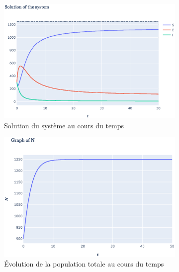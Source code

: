 \documentclass[11pt]{article}
\begin{document}
\begin{figure}[th]
	\begin{subfigure}{0.49\textwidth}
	  \centering
	  \includegraphics[width=\linewidth]{../figures/numerical_study_R0_gt1_1.eps}  
	  \caption{Solution du syst\`eme au cours du temps}
	  \label{fig:numerical study r0 gt 1 a}
	\end{subfigure}
	\begin{subfigure}{0.49\textwidth}
	  \centering
	  \includegraphics[width=\linewidth]{../figures/numerical_study_R0_gt1_2.eps}  
	  \caption{\'Evolution de la population totale au cours du temps}
	  \label{fig:numerical study r0 gt 1 b}
	\end{subfigure}\\
	\begin{subfigure}{0.49\textwidth}
	  \centering

\end{subfigure}
\end{figure}
\end{document}
